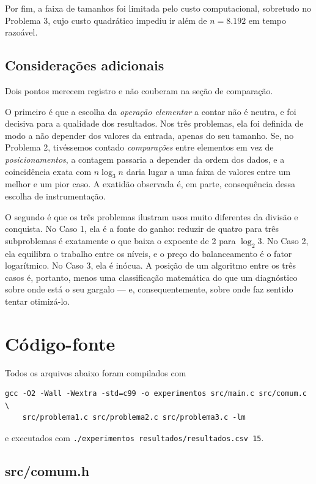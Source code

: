 \documentclass[11pt,a4paper]{article}
\begin{document}
Por fim, a faixa de tamanhos foi limitada pelo custo computacional, sobretudo no Problema 3, cujo custo quadrático impediu ir além de $n=8.192$ em tempo razoável.

\subsection{Considerações adicionais}

Dois pontos merecem registro e não couberam na seção de comparação.

O primeiro é que a escolha da \emph{operação elementar} a contar não é neutra, e foi decisiva para a qualidade dos resultados. Nos três problemas, ela foi definida de modo a não depender dos valores da entrada, apenas do seu tamanho. Se, no Problema 2, tivéssemos contado \emph{comparações} entre elementos em vez de \emph{posicionamentos}, a contagem passaria a depender da ordem dos dados, e a coincidência exata com $n\log_3 n$ daria lugar a uma faixa de valores entre um melhor e um pior caso. A exatidão observada é, em parte, consequência dessa escolha de instrumentação.

O segundo é que os três problemas ilustram usos muito diferentes da divisão e conquista. No Caso 1, ela é a fonte do ganho: reduzir de quatro para três subproblemas é exatamente o que baixa o expoente de 2 para $\log_2 3$. No Caso 2, ela equilibra o trabalho entre os níveis, e o preço do balanceamento é o fator logarítmico. No Caso 3, ela é inócua. A posição de um algoritmo entre os três casos é, portanto, menos uma classificação matemática do que um diagnóstico sobre onde está o seu gargalo --- e, consequentemente, sobre onde faz sentido tentar otimizá-lo.

\appendix
\section{Código-fonte}

Todos os arquivos abaixo foram compilados com
\begin{lstlisting}[style=cmd]
gcc -O2 -Wall -Wextra -std=c99 -o experimentos src/main.c src/comum.c \
    src/problema1.c src/problema2.c src/problema3.c -lm
\end{lstlisting}
e executados com \texttt{./experimentos resultados/resultados.csv 15}.

\subsection*{src/comum.h}

\end{document}
